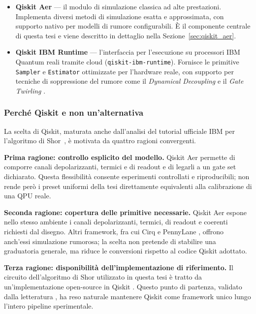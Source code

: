 \begin{onehalfspace}
\begin{itemize}
    \item \textbf{Qiskit Aer} — il modulo di simulazione classica ad alte prestazioni. Implementa diversi metodi di simulazione esatta e approssimata, con supporto nativo per modelli di rumore configurabili. È il componente centrale di questa tesi e viene descritto in dettaglio nella Sezione~\ref{sec:qiskit_aer}.

    \item \textbf{Qiskit IBM Runtime} — l'interfaccia per l'esecuzione su processori \ac{IBM} Quantum reali tramite cloud (\texttt{qiskit-ibm-runtime}). Fornisce le primitive \texttt{Sampler} e \texttt{Estimator} ottimizzate per l'hardware reale, con supporto per tecniche di soppressione del rumore come il \textit{Dynamical Decoupling} e il \textit{Gate Twirling} \cite{ibm_shor_tutorial}.

\end{itemize}

\subsubsection{Perché Qiskit e non un'alternativa}
\label{sec:confronto_framework}

La scelta di Qiskit, maturata anche dall'analisi del tutorial ufficiale \ac{IBM} per l'algoritmo di Shor~\cite{ibm_shor_tutorial}, è motivata da quattro ragioni convergenti.

\textbf{Prima ragione: controllo esplicito del modello.} Qiskit Aer permette di comporre canali depolarizzanti, termici e di readout e di legarli a un gate set dichiarato. Questa flessibilità consente esperimenti controllati e riproducibili; non rende però i preset uniformi della tesi direttamente equivalenti alla calibrazione di una QPU reale.

\textbf{Seconda ragione: copertura delle primitive necessarie.} Qiskit Aer espone nello stesso ambiente i canali depolarizzanti, termici, di readout e coerenti richiesti dal disegno. Altri framework, fra cui Cirq \cite{cirq2024} e PennyLane \cite{pennylane2022}, offrono anch'essi simulazione rumorosa; la scelta non pretende di stabilire una graduatoria generale, ma riduce le conversioni rispetto al codice Qiskit adottato.

\textbf{Terza ragione: disponibilità dell'implementazione di riferimento.} Il circuito dell'algoritmo di Shor utilizzato in questa tesi è tratto da un'implementazione open-source in Qiskit \cite{github_shor}. Questo punto di partenza, validato dalla letteratura \cite{skosana2021}, ha reso naturale mantenere Qiskit come framework unico lungo l'intero pipeline sperimentale.


\end{onehalfspace}
